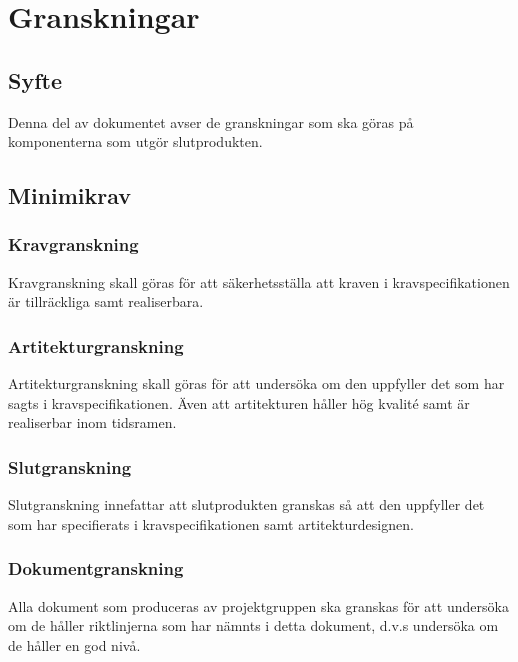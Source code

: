 \section{Granskningar}

\subsection{Syfte}
Denna del av dokumentet avser de granskningar som ska göras på komponenterna som utgör slutprodukten. 

\subsection{Minimikrav}

\subsubsection{Kravgranskning}
Kravgranskning skall göras för att säkerhetsställa att kraven i kravspecifikationen är tillräckliga samt realiserbara.

\subsubsection{Artitekturgranskning}
Artitekturgranskning skall göras för att undersöka om den uppfyller det som har sagts i kravspecifikationen. Även att artitekturen håller hög kvalité samt är realiserbar inom tidsramen. 

\subsubsection{Slutgranskning}
Slutgranskning innefattar att slutprodukten granskas så att den uppfyller det som har specifierats i kravspecifikationen samt artitekturdesignen. 

\subsubsection{Dokumentgranskning}
Alla dokument som produceras av projektgruppen ska granskas för att undersöka om de håller riktlinjerna som har nämnts i detta dokument, d.v.s undersöka om de håller en god nivå. 



